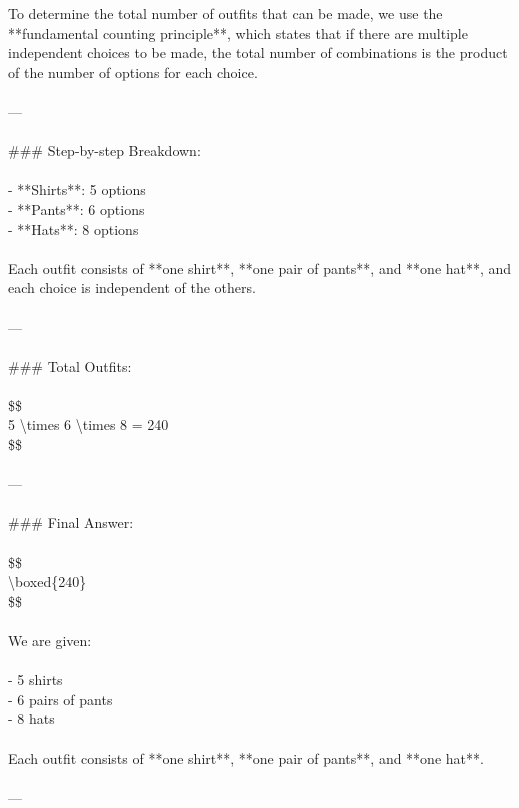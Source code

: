\hfill
\begin{minipage}[t]{0.31\linewidth}\raggedright\fontsize{6.5}{7.6}\selectfont\ttfamily
 To determine the total number of outfits that can be made, we use the **fundamental counting principle**, which states that if there are multiple independent choices to be made, the total number of combinations is the product of the number of options for each choice.\\
\mbox{}\\
---\\
\mbox{}\\
\#\#\# Step-by-step Breakdown:\\
\mbox{}\\
- **Shirts**: 5 options\\
- **Pants**: 6 options\\
- **Hats**: 8 options\\
\mbox{}\\
Each outfit consists of **one shirt**, **one pair of pants**, and **one hat**, and each choice is independent of the others.\\
\mbox{}\\
---\\
\mbox{}\\
\#\#\# Total Outfits:\\
\mbox{}\\
\$\$\\
5 \textbackslash{}times 6 \textbackslash{}times 8 = 240\\
\$\$\\
\mbox{}\\
---\\
\mbox{}\\
\#\#\# Final Answer:\\
\mbox{}\\
\$\$\\
\textbackslash{}boxed\{240\}\\
\$\$\\
\mbox{}\\
We are given:\\
\mbox{}\\
- 5 shirts\\
- 6 pairs of pants\\
- 8 hats\\
\mbox{}\\
Each outfit consists of **one shirt**, **one pair of pants**, and **one hat**.\\
\mbox{}\\
---\\
\mbox{}\\

\end{minipage}
